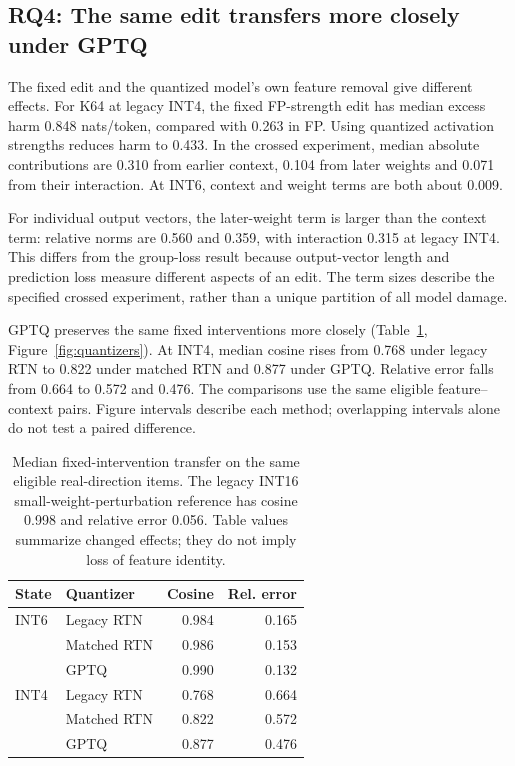 \documentclass[11pt]{article}
\begin{document}
\subsection{RQ4: The same edit transfers more closely under GPTQ}
The fixed edit and the quantized model's own feature removal give different effects. For K64 at legacy INT4, the fixed FP-strength edit has median excess harm 0.848 nats/token, compared with 0.263 in FP. Using quantized activation strengths reduces harm to 0.433. In the crossed experiment, median absolute contributions are 0.310 from earlier context, 0.104 from later weights and 0.071 from their interaction. At INT6, context and weight terms are both about 0.009.

For individual output vectors, the later-weight term is larger than the context term: relative norms are 0.560 and 0.359, with interaction 0.315 at legacy INT4. This differs from the group-loss result because output-vector length and prediction loss measure different aspects of an edit. The term sizes describe the specified crossed experiment, rather than a unique partition of all model damage.

GPTQ preserves the same fixed interventions more closely (Table~\ref{tab:transfer}, Figure~\ref{fig:quantizers}). At INT4, median cosine rises from 0.768 under legacy RTN to 0.822 under matched RTN and 0.877 under GPTQ. Relative error falls from 0.664 to 0.572 and 0.476. The comparisons use the same eligible feature--context pairs. Figure intervals describe each method; overlapping intervals alone do not test a paired difference.

\begin{table}[t]
\centering\small
\begin{tabular}{llrr}
\toprule
State & Quantizer & Cosine & Rel. error\\
\midrule
INT6 & Legacy RTN & 0.984 & 0.165\\
 & Matched RTN & 0.986 & 0.153\\
 & GPTQ & 0.990 & 0.132\\
INT4 & Legacy RTN & 0.768 & 0.664\\
 & Matched RTN & 0.822 & 0.572\\
 & GPTQ & 0.877 & 0.476\\
\bottomrule
\end{tabular}
\caption{Median fixed-intervention transfer on the same eligible real-direction items. The legacy INT16 small-weight-perturbation reference has cosine 0.998 and relative error 0.056. Table values summarize changed effects; they do not imply loss of feature identity.}
\label{tab:transfer}
\end{table}
\end{document}
